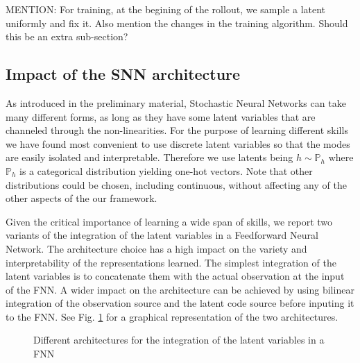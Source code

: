 \documentclass{article} %
\begin{document}
MENTION: For training, at the begining of the rollout, we sample a latent uniformly and fix it. Also mention the changes in the training algorithm. Should this be an extra sub-section? 

\subsection{Impact of the SNN architecture}
As introduced in the preliminary material, Stochastic Neural Networks can take many different forms, as long as they have some latent variables that are channeled through the non-linearities. For the purpose of learning different skills we have found most convenient to use discrete latent variables so that the modes are easily isolated and interpretable. Therefore we use latents being $h\sim \mathbb{P}_h$ where $\mathbb{P}_h$ is a categorical distribution yielding one-hot vectors. Note that other distributions could be chosen, including continuous, without affecting any of the other aspects of the our framework.

Given the critical importance of learning a wide span of skills, we report two variants of the integration of the latent variables in a Feedforward Neural Network. The architecture choice has a high impact on the variety and interpretability of the representations learned. The simplest integration of the latent variables is to concatenate them with the actual observation at the input of the FNN. A wider impact on the architecture can be achieved by using bilinear integration of the observation source and the latent code source before inputing it to the FNN. See Fig. \ref{fig:snn_architecture} for a graphical representation of the two architectures. 
\begin{figure}
	\centering
	\caption{Different architectures for the integration of the latent variables in a FNN}
	\label{fig:snn_architecture}
\end{figure}
\end{document}
